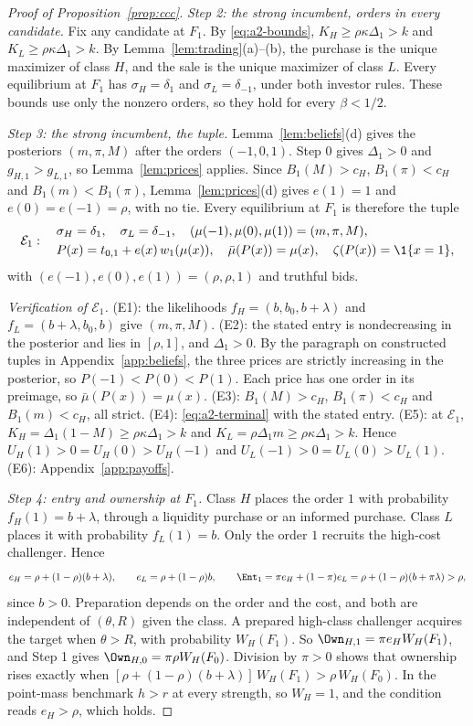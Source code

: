 \begin{proof}[Proof of Proposition~\ref{prop:ccc}]
\emph{Step 2: the strong incumbent, orders in every candidate.} Fix any candidate at \(F_1\). By
\eqref{eq:a2-bounds}, \(K_H\ge\rho\kappa\Delta_1>k\) and \(K_L\ge\rho\kappa\Delta_1>k\). By
Lemma~\ref{lem:trading}(a)--(b), the purchase is the unique maximizer of class \(H\), and the sale is the unique
maximizer of class \(L\). Every equilibrium at \(F_1\) has \(\sigma_H=\delta_1\) and \(\sigma_L=\delta_{-1}\), under
both investor rules. These bounds use only the nonzero orders, so they hold for every \(\beta<1/2\).

\emph{Step 3: the strong incumbent, the tuple.} Lemma~\ref{lem:beliefs}(d) gives the posteriors \((m,\pi,M)\) after
the orders \((-1,0,1)\). Step 0 gives \(\Delta_1>0\) and \(g_{H,1}>g_{L,1}\), so Lemma~\ref{lem:prices} applies.
Since \(B_1(M)>c_H\), \(B_1(\pi)<c_H\) and \(B_1(m)<B_1(\pi)\), Lemma~\ref{lem:prices}(d) gives \(e(1)=1\) and
\(e(0)=e(-1)=\rho\), with no tie. Every equilibrium at \(F_1\) is therefore the tuple
\[
\mathcal E_1:\quad
\begin{aligned}
&\sigma_H=\delta_1,\quad \sigma_L=\delta_{-1},\quad (\mu(-1),\mu(0),\mu(1))=(m,\pi,M),\\
&P(x)=t_{0,1}+e(x)\,w_1(\mu(x)),\quad \bar\mu(P(x))=\mu(x),\quad \zeta(P(x))=\1\{x=1\},
\end{aligned}
\]
with \((e(-1),e(0),e(1))=(\rho,\rho,1)\) and truthful bids.

\emph{Verification of \(\mathcal E_1\).} (E1): the likelihoods \(f_H=(b,b_0,b+\lambda)\) and
\(f_L=(b+\lambda,b_0,b)\) give \((m,\pi,M)\). (E2): the stated entry is nondecreasing in the posterior and lies in
\([\rho,1]\), and \(\Delta_1>0\). By the paragraph on constructed tuples in Appendix~\ref{app:beliefs}, the three
prices are strictly increasing in the posterior, so \(P(-1)<P(0)<P(1)\). Each price has one order in its
preimage, so \(\bar\mu(P(x))=\mu(x)\). (E3): \(B_1(M)>c_H\), \(B_1(\pi)<c_H\) and \(B_1(m)<c_H\), all strict.
(E4): \eqref{eq:a2-terminal} with the stated entry. (E5): at \(\mathcal E_1\), \(K_H=\Delta_1(1-M)\ge\rho\kappa\Delta_1>k\)
and \(K_L=\rho\Delta_1m\ge\rho\kappa\Delta_1>k\). Hence \(U_H(1)>0=U_H(0)>U_H(-1)\) and
\(U_L(-1)>0=U_L(0)>U_L(1)\). (E6): Appendix~\ref{app:payoffs}.

\emph{Step 4: entry and ownership at \(F_1\).} Class \(H\) places the order \(1\) with probability
\(f_H(1)=b+\lambda\), through a liquidity purchase or an informed purchase. Class \(L\) places it with probability
\(f_L(1)=b\). Only the order \(1\) recruits the high-cost challenger. Hence
\[
e_H=\rho+(1-\rho)(b+\lambda),\qquad e_L=\rho+(1-\rho)b,\qquad
\Ent_1=\pi e_H+(1-\pi)e_L=\rho+(1-\rho)(b+\pi\lambda)>\rho ,
\]
since \(b>0\). Preparation depends on the order and the cost, and both are independent of \((\theta,R)\) given the
class. A prepared high-class challenger acquires the target when \(\theta>R\), with probability \(W_H(F_1)\). So
\(\Own_{H,1}=\pi e_HW_H(F_1)\), and Step 1 gives \(\Own_{H,0}=\pi\rho W_H(F_0)\). Division by \(\pi>0\) shows that
ownership rises exactly when \([\rho+(1-\rho)(b+\lambda)]\,W_H(F_1)>\rho\,W_H(F_0)\). In the point-mass benchmark
\(h>r\) at every strength, so \(W_H=1\), and the condition reads \(e_H>\rho\), which holds.


\end{proof}
